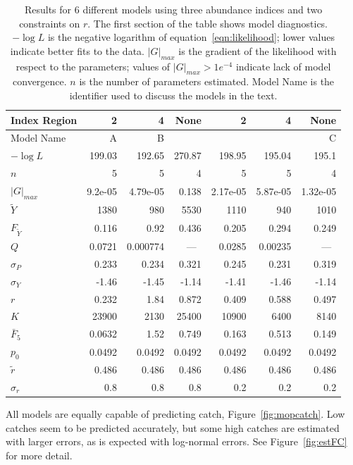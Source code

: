 \documentclass[12pt,letterpaper]{article}
\newcommand\MSY{\widetilde{Y}}
\newcommand\Fmsy{F_{\MSY}}
\begin{document}
\begin{table}
{\small
\caption{Results for 6 different models using three
abundance indices and two constraints on $r$. The first section of the
table shows model diagnostics. $-\log L$ is the negative logarithm of
equation~\ref{eqn:likelihood}; lower values indicate better fits to
the data.
$|G|_{max}$ is the gradient of the likelihood with respect to the
parameters; values of $|G|_{max}>1e^{-4}$ indicate lack of model
convergence.
$n$ is the number of parameters estimated.
Model Name is the identifier used to discuss the models in the
text.
}
\label{tab:ests1}
\begin{center}
\begin{tabular}{|l|rrr|rrr|}
\hline
Index Region  &  2& 4& None& 2& 4& None\\
\hline
Model Name & A    & B   &     &     &     & C\\
\hline
\hline
$-\log L$ & 199.03 & 192.65 & 270.87 & 198.95 & 195.04 & 195.1\\
$n$ & 5 & 5 & 4 & 5 & 5 & 4\\
$|G|_{max}$ & 9.2e-05 & 4.79e-05 & 0.138 & 2.17e-05 & 5.87e-05 & 1.32e-05\\
\hline
$\MSY$ & 1380 & 980 & 5530 & 1110 & 940 & 1010\\
$\Fmsy$ & 0.116 & 0.92 & 0.436 & 0.205 & 0.294 & 0.249\\
$Q$ & 0.0721 & 0.000774 & ~---~ & 0.0285 & 0.00235 & ~---~\\
$\sigma_P$ & 0.233 & 0.234 & 0.321 & 0.245 & 0.231 & 0.319\\
$\sigma_Y$ & -1.46 & -1.45 & -1.14 & -1.41 & -1.46 & -1.14\\
\hline
$r$ & 0.232 & 1.84 & 0.872 & 0.409 & 0.588 & 0.497\\
$K$ & 23900 & 2130 & 25400 & 10900 & 6400 & 8140\\
$\bar{F}_5$ & 0.0632 & 1.52 & 0.749 & 0.163 & 0.513 & 0.149\\
\hline
$p_0$ & 0.0492 & 0.0492 & 0.0492 & 0.0492 & 0.0492 & 0.0492\\
$\tilde{r}$ & 0.486 & 0.486 & 0.486 & 0.486 & 0.486 & 0.486\\
$\sigma_r$ & 0.8 & 0.8 & 0.8 & 0.2 & 0.2 & 0.2\\
\hline
\end{tabular}
\end{center}
}
\end{table}


All models are equally capable of predicting catch,
Figure~\ref{fig:mopcatch}. Low catches seem to be predicted
accurately, but some high catches are estimated with larger errors, as is
expected with log-normal errors. 
See Figure~\ref{fig:estFC} for more detail.
\end{document}
